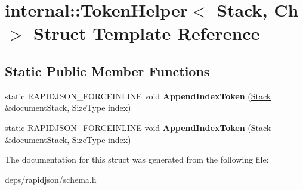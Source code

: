 \hypertarget{structinternal_1_1_token_helper}{}\section{internal\+:\+:Token\+Helper$<$ Stack, Ch $>$ Struct Template Reference}
\label{structinternal_1_1_token_helper}
\subsection*{Static Public Member Functions}
\begin{DoxyCompactItemize}
\item 
static R\+A\+P\+I\+D\+J\+S\+O\+N\+\_\+\+F\+O\+R\+C\+E\+I\+N\+L\+I\+NE void {\bfseries Append\+Index\+Token} (\hyperlink{classinternal_1_1_stack}{Stack} \&document\+Stack, Size\+Type index)\hypertarget{structinternal_1_1_token_helper_a7b1864bfe6d4014ba7a5114acb26b3ae}{}\label{structinternal_1_1_token_helper_a7b1864bfe6d4014ba7a5114acb26b3ae}

\item 
static R\+A\+P\+I\+D\+J\+S\+O\+N\+\_\+\+F\+O\+R\+C\+E\+I\+N\+L\+I\+NE void {\bfseries Append\+Index\+Token} (\hyperlink{classinternal_1_1_stack}{Stack} \&document\+Stack, Size\+Type index)\hypertarget{structinternal_1_1_token_helper_a7b1864bfe6d4014ba7a5114acb26b3ae}{}\label{structinternal_1_1_token_helper_a7b1864bfe6d4014ba7a5114acb26b3ae}

\end{DoxyCompactItemize}


The documentation for this struct was generated from the following file\+:\begin{DoxyCompactItemize}
\item 
deps/rapidjson/schema.\+h\end{DoxyCompactItemize}
